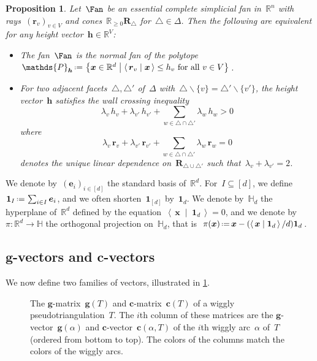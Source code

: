 \documentclass{amsart}
\newtheorem{proposition}[theorem]{Proposition}
\theoremstyle{definition}
\newcommand{\R}{\mathbb{R}} %
\newcommand{\HH}{\mathbb{H}} %
\renewcommand{\b}[1]{{\boldsymbol{#1}}} %
\newcommand{\set}[2]{\left\{ #1 \;\middle|\; #2 \right\}} %
\newcommand{\ssm}{\smallsetminus} %
\newcommand{\dotprod}[2]{\left\langle \, #1 \; \middle| \; #2 \, \right\rangle} %
\newcommand{\one}{\b{1}} %
\newcommand{\eqdef}{\mbox{\,\raisebox{0.2ex}{\scriptsize\ensuremath{\mathrm:}}\ensuremath{=}\,}} %
\newcommand{\darkblue}{\color{darkblue}} %
\newcommand{\defn}[1]{\textsl{\darkblue #1}} %
\newcommand{\polytope}[1]{\mathds{#1}} %
\begin{document}
\begin{proposition}
\label{prop:characterizationPolytopalFan}
Let~$\Fan$ be an essential complete simplicial fan in~$\R^n$ with rays~$(\b{r}_v)_{v \in V}$ and cones~$\R_{\ge 0} \b{R}_\triangle$ for~$\triangle \in \Delta$.
Then the following are equivalent for any height vector~$\b{h} \in \R^V$:
\begin{itemize}
\item The fan~$\Fan$ is the normal fan of the polytope~$\polytope{P}_{\b{h}} \eqdef \set{\b{x} \in \R^d}{\dotprod{\b{r}_v}{\b{x}} \le h_v \text{ for all } v \in V}$.
\item For two adjacent facets~$\triangle, \triangle'$ of~$\Delta$ with~$\triangle \ssm \{v\} = \triangle' \ssm \{v'\}$, the height vector~$\b{h}$ satisfies the \defn{wall crossing inequality}
\[
\lambda_v \, h_v + \lambda_{v'} \, h_{v'} + \sum_{w \in \triangle \cap \triangle'} \lambda_w \, h_w > 0
\]
where
\[
\lambda_v \, \b{r}_v + \lambda_{v'} \, \b{r}_{v'} + \sum_{w \in \triangle \cap \triangle'} \lambda_w \, \b{r}_w = 0
\]
denotes the unique linear dependence on~$\b{R}_{\triangle \cup \triangle'}$ such that~$\lambda_v + \lambda_{v'} = 2$.
\end{itemize}
\end{proposition}

We denote by~$(\b{e}_i)_{i \in [d]}$ the standard basis of~$\R^d$.
For~$I \subseteq [d]$, we define~$\one_I \eqdef \sum_{i \in I} \b{e}_i$, and we often shorten~$\one_{[d]}$ by~$\one_d$.
We denote by~$\HH_d$ the hyperplane of~$\R^d$ defined by the equation~$\dotprod{\b{x}}{\one_d} = 0$, and we denote by~$\pi : \R^d \to \HH$ the orthogonal projection on~$\HH_d$, that is~$\pi(\b{x}) \eqdef \b{x} - (\dotprod{\b{x}}{\one_d} / d) \one_d$.


\subsection{$\b{g}$-vectors and $\b{c}$-vectors}
\label{subsec:gcvectors}

We now define two families of vectors, illustrated in \cref{fig:pseudotriangulationMatrices}.
%
\begin{figure}
\centerline{ \quad }
\caption{The $\b{g}$-matrix~$\b{g}(T)$ and $\b{c}$-matrix~$\b{c}(T)$ of a wiggly pseudotriangulation~$T$. The $i$th column of these matrices are the $\b{g}$-vector~$\b{g}(\alpha)$ and $\b{c}$-vector~$\b{c}(\alpha, T)$ of the $i$th wiggly arc~$\alpha$ of~$T$ (ordered from bottom to top). The colors of the columns match the colors of the wiggly arcs.}
\label{fig:pseudotriangulationMatrices}
\end{figure}
\end{document}

